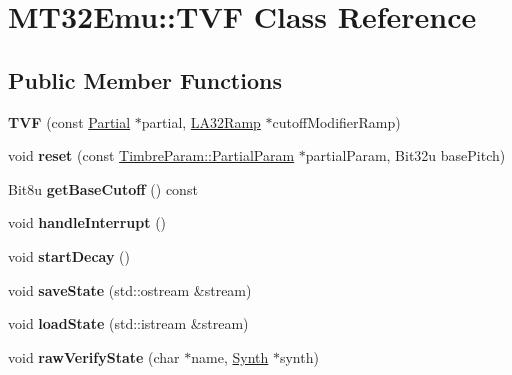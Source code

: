 \hypertarget{classMT32Emu_1_1TVF}{\section{M\-T32\-Emu\-:\-:T\-V\-F Class Reference}
\label{classMT32Emu_1_1TVF}
}
\subsection*{Public Member Functions}
\begin{DoxyCompactItemize}
\item 
\hypertarget{classMT32Emu_1_1TVF_a70cd38718f87429f9ef6ba2938e166a6}{{\bfseries T\-V\-F} (const \hyperlink{classMT32Emu_1_1Partial}{Partial} $\ast$partial, \hyperlink{classMT32Emu_1_1LA32Ramp}{L\-A32\-Ramp} $\ast$cutoff\-Modifier\-Ramp)}\label{classMT32Emu_1_1TVF_a70cd38718f87429f9ef6ba2938e166a6}

\item 
\hypertarget{classMT32Emu_1_1TVF_af5a3a3c17283fcc13495901bc9bc2992}{void {\bfseries reset} (const \hyperlink{structMT32Emu_1_1TimbreParam_1_1PartialParam}{Timbre\-Param\-::\-Partial\-Param} $\ast$partial\-Param, Bit32u base\-Pitch)}\label{classMT32Emu_1_1TVF_af5a3a3c17283fcc13495901bc9bc2992}

\item 
\hypertarget{classMT32Emu_1_1TVF_a87bd8d43b8c5a68bc615f98d223ac04d}{Bit8u {\bfseries get\-Base\-Cutoff} () const }\label{classMT32Emu_1_1TVF_a87bd8d43b8c5a68bc615f98d223ac04d}

\item 
\hypertarget{classMT32Emu_1_1TVF_a49cc8c8c2c35935a2f4e7eca3fe39def}{void {\bfseries handle\-Interrupt} ()}\label{classMT32Emu_1_1TVF_a49cc8c8c2c35935a2f4e7eca3fe39def}

\item 
\hypertarget{classMT32Emu_1_1TVF_a1e9c37d4d1d9ce3caf71762ceb8a11db}{void {\bfseries start\-Decay} ()}\label{classMT32Emu_1_1TVF_a1e9c37d4d1d9ce3caf71762ceb8a11db}

\item 
\hypertarget{classMT32Emu_1_1TVF_a77f243afef36245ad479b238427117cf}{void {\bfseries save\-State} (std\-::ostream \&stream)}\label{classMT32Emu_1_1TVF_a77f243afef36245ad479b238427117cf}

\item 
\hypertarget{classMT32Emu_1_1TVF_ad015eb1308dd4cba77ad61fd1af6806f}{void {\bfseries load\-State} (std\-::istream \&stream)}\label{classMT32Emu_1_1TVF_ad015eb1308dd4cba77ad61fd1af6806f}

\item 
\hypertarget{classMT32Emu_1_1TVF_a55a05d98d16a9542112c92ea3747d994}{void {\bfseries raw\-Verify\-State} (char $\ast$name, \hyperlink{classMT32Emu_1_1Synth}{Synth} $\ast$synth)}\label{classMT32Emu_1_1TVF_a55a05d98d16a9542112c92ea3747d994}

\end{DoxyCompactItemize}


